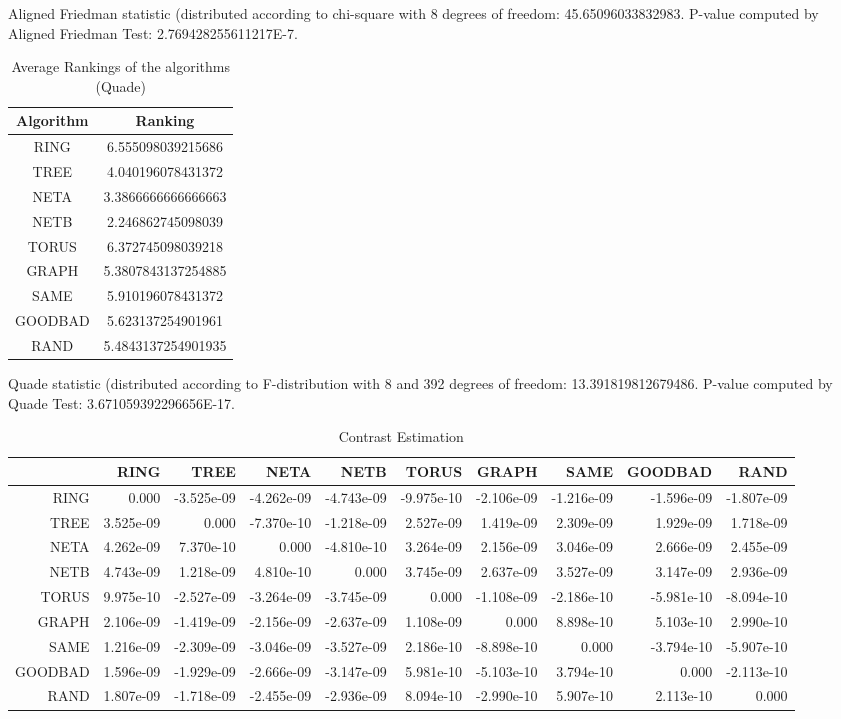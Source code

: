 \documentclass[a4paper,10pt]{article}
\begin{document}
\begin{landscape}
Aligned Friedman statistic (distributed according to chi-square with 8 degrees of freedom: 45.65096033832983. 
P-value computed by Aligned Friedman Test: 2.769428255611217E-7.\newline


\newpage

\begin{table}[!htp]
\centering
\caption{Average Rankings of the algorithms (Quade)
}\begin{tabular}{c|c}
Algorithm&Ranking\\
\hline
 RING&6.555098039215686\\
 TREE&4.040196078431372\\
 NETA&3.3866666666666663\\
 NETB&2.246862745098039\\
 TORUS&6.372745098039218\\
 GRAPH&5.3807843137254885\\
 SAME&5.910196078431372\\
 GOODBAD&5.623137254901961\\
 RAND&5.4843137254901935\\
\end{tabular}
\end{table}
Quade statistic (distributed according to F-distribution with 8 and 392 degrees of freedom: 13.391819812679486. 
P-value computed by Quade Test: 3.671059392296656E-17.\newline


\newpage

\begin{table}[!htp]
\centering\tiny
\caption{Contrast Estimation}
\begin{tabular}{
|r|r|r|r|r|r|r|r|r|r|}
\hline
 & RING& TREE& NETA& NETB& TORUS& GRAPH& SAME& GOODBAD& RAND\\
\hline
 RING&0.000&-3.525e-09&-4.262e-09&-4.743e-09&-9.975e-10&-2.106e-09&-1.216e-09&-1.596e-09&-1.807e-09\\
\hline
 TREE&3.525e-09&0.000&-7.370e-10&-1.218e-09&2.527e-09&1.419e-09&2.309e-09&1.929e-09&1.718e-09\\
\hline
 NETA&4.262e-09&7.370e-10&0.000&-4.810e-10&3.264e-09&2.156e-09&3.046e-09&2.666e-09&2.455e-09\\
\hline
 NETB&4.743e-09&1.218e-09&4.810e-10&0.000&3.745e-09&2.637e-09&3.527e-09&3.147e-09&2.936e-09\\
\hline
 TORUS&9.975e-10&-2.527e-09&-3.264e-09&-3.745e-09&0.000&-1.108e-09&-2.186e-10&-5.981e-10&-8.094e-10\\
\hline
 GRAPH&2.106e-09&-1.419e-09&-2.156e-09&-2.637e-09&1.108e-09&0.000&8.898e-10&5.103e-10&2.990e-10\\
\hline
 SAME&1.216e-09&-2.309e-09&-3.046e-09&-3.527e-09&2.186e-10&-8.898e-10&0.000&-3.794e-10&-5.907e-10\\
\hline
 GOODBAD&1.596e-09&-1.929e-09&-2.666e-09&-3.147e-09&5.981e-10&-5.103e-10&3.794e-10&0.000&-2.113e-10\\
\hline
 RAND&1.807e-09&-1.718e-09&-2.455e-09&-2.936e-09&8.094e-10&-2.990e-10&5.907e-10&2.113e-10&0.000\\
\hline


\end{tabular}
\end{table}
\end{landscape}
\end{document}
